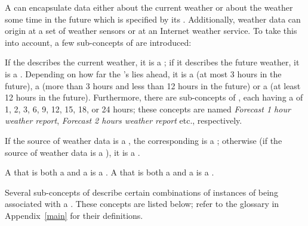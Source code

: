 A  can encapsulate data either about the current weather or about the weather some time in the future which is specified by its . Additionally, weather data can origin at a set of weather sensors or at an Internet weather service. To take this into account, a few sub-concepts of  are introduced:

If the  describes the current weather, it is a ; if it describes the future weather, it is a . Depending on how far the 's  lies ahead, it is a  (at most 3 hours in the future), a  (more than 3 hours and less than 12 hours in the future) or a  (at least 12 hours in the future). Furthermore, there are sub-concepts of , each having a  of 1, 2, 3, 6, 9, 12, 15, 18, or 24 hours; these concepts are named \emph{Forecast 1 hour weather report}, \emph{Forecast 2 hours weather report} etc., respectively.

If the source of weather data is a , the corresponding  is a ; otherwise (if the source of weather data is a ), it is a .

A  that is both a  and a  is a . A  that is both a  and a  is a .

Several sub-concepts of  describe certain combinations of instances of  being associated with a . These concepts are listed below; refer to the glossary in Appendix~\ref{main} for their definitions.

